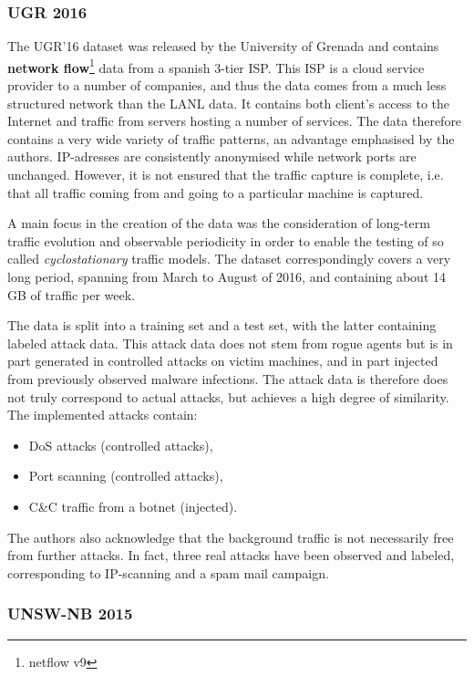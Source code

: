 \documentclass[a4paper,12pt,twoside]{report}
\begin{document}
\subsubsection*{UGR 2016 \cite{macia2018ugr}}

The UGR'16 dataset was released by the University of Grenada and contains \textbf{network flow}\footnote{netflow v9} data from a spanish 3-tier ISP. This ISP is a cloud service provider to a number of companies, and thus the data comes from a much less structured network than the LANL data. It contains both client's access to the Internet and traffic from servers hosting a number of services. The data therefore contains a very wide variety of traffic patterns, an advantage emphasised by the authors. IP-adresses are consistently anonymised while network ports are unchanged. However, it is not ensured that the traffic capture is complete, i.e. that all traffic coming from and going to a particular machine is captured.

A main focus in the creation of the data was the consideration of long-term traffic evolution and observable periodicity in order to enable the testing of so called \textit{cyclostationary} traffic models. The dataset correspondingly covers a very long period, spanning from March to August of 2016, and containing about 14 GB of traffic per week. 

The data is split into a training set and a test set, with the latter containing labeled attack data. This attack data does not stem from rogue agents but is in part generated in controlled attacks on victim machines, and in part injected from previously observed malware infections. The attack data is therefore does not truly correspond to actual attacks, but achieves a high degree of similarity. The implemented attacks contain:
\begin{itemize}
\item DoS attacks (controlled attacks),
\item Port scanning (controlled attacks),
\item C\&C traffic from a botnet (injected).
\end{itemize}

The authors also acknowledge that the background traffic is not necessarily free from further attacks. In fact, three real attacks have been observed and labeled, corresponding to IP-scanning and a spam mail campaign.

\subsubsection*{UNSW-NB 2015 \cite{moustafa_unsw-nb15:_2015}}
\end{document}
